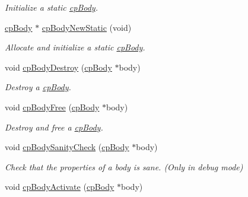 \begin{DoxyCompactItemize}
\begin{DoxyCompactList}\small\item\em Initialize a static \hyperlink{structcp_body}{cp\-Body}. \end{DoxyCompactList}\item 
\hypertarget{group__cp_body_gaef08bd4d7afd793e859f5d7b1001344c}{\hyperlink{structcp_body}{cp\-Body} $\ast$ \hyperlink{group__cp_body_gaef08bd4d7afd793e859f5d7b1001344c}{cp\-Body\-New\-Static} (void)}\label{group__cp_body_gaef08bd4d7afd793e859f5d7b1001344c}

\begin{DoxyCompactList}\small\item\em Allocate and initialize a static \hyperlink{structcp_body}{cp\-Body}. \end{DoxyCompactList}\item 
\hypertarget{group__cp_body_ga7691fd53f979e5f1e23fbdbc7b0ab31a}{void \hyperlink{group__cp_body_ga7691fd53f979e5f1e23fbdbc7b0ab31a}{cp\-Body\-Destroy} (\hyperlink{structcp_body}{cp\-Body} $\ast$body)}\label{group__cp_body_ga7691fd53f979e5f1e23fbdbc7b0ab31a}

\begin{DoxyCompactList}\small\item\em Destroy a \hyperlink{structcp_body}{cp\-Body}. \end{DoxyCompactList}\item 
\hypertarget{group__cp_body_gab122c9fc675a7f2cb6a644a1532c60f7}{void \hyperlink{group__cp_body_gab122c9fc675a7f2cb6a644a1532c60f7}{cp\-Body\-Free} (\hyperlink{structcp_body}{cp\-Body} $\ast$body)}\label{group__cp_body_gab122c9fc675a7f2cb6a644a1532c60f7}

\begin{DoxyCompactList}\small\item\em Destroy and free a \hyperlink{structcp_body}{cp\-Body}. \end{DoxyCompactList}\item 
\hypertarget{group__cp_body_ga21607229d9fd49281a7a94a1b09664de}{void \hyperlink{group__cp_body_ga21607229d9fd49281a7a94a1b09664de}{cp\-Body\-Sanity\-Check} (\hyperlink{structcp_body}{cp\-Body} $\ast$body)}\label{group__cp_body_ga21607229d9fd49281a7a94a1b09664de}

\begin{DoxyCompactList}\small\item\em Check that the properties of a body is sane. (Only in debug mode) \end{DoxyCompactList}\item 
\hypertarget{group__cp_body_ga9f6b2af6329a2b5c32712576719d357a}{void \hyperlink{group__cp_body_ga9f6b2af6329a2b5c32712576719d357a}{cp\-Body\-Activate} (\hyperlink{structcp_body}{cp\-Body} $\ast$body)}\label{group__cp_body_ga9f6b2af6329a2b5c32712576719d357a}


\end{DoxyCompactItemize}
